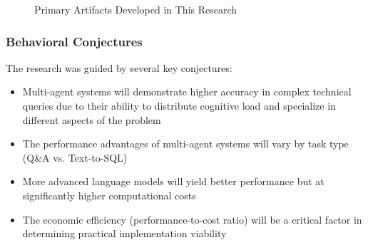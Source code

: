         \begin{figure}[h]
        \centering
        \begin{minipage}{0.45\textwidth}
            \centering
        \end{minipage}
        \hfill
        \begin{minipage}{0.45\textwidth}
            \centering
        \end{minipage}
        \caption{Primary Artifacts Developed in This Research}
        \label{fig:artifacts}
        \end{figure}
        
        
        \subsubsection{Behavioral Conjectures}
        
        The research was guided by several key conjectures:
        
        \begin{tcolorbox}[colback=gray!10, colframe=gray!40, title=Key Research Conjectures]
            \begin{itemize}
            \item Multi-agent systems will demonstrate higher accuracy in complex technical queries due to their ability to distribute cognitive load and specialize in different aspects of the problem
            \item The performance advantages of multi-agent systems will vary by task type (Q\&A vs. Text-to-SQL)
            \item More advanced language models will yield better performance but at significantly higher computational costs
            \item The economic efficiency (performance-to-cost ratio) will be a critical factor in determining practical implementation viability
            \end{itemize}
        \end{tcolorbox}
        
